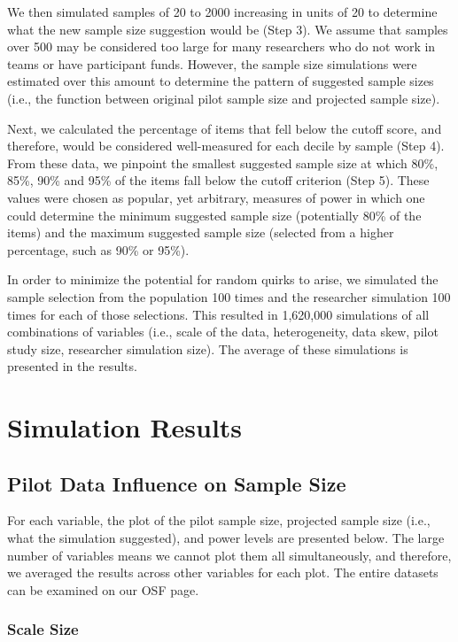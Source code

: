 \documentclass[
  man]{apa7}
\begin{document}
We then simulated samples of 20 to 2000 increasing in units of 20 to determine what the new sample size suggestion would be (Step 3). We assume that samples over 500 may be considered too large for many researchers who do not work in teams or have participant funds. However, the sample size simulations were estimated over this amount to determine the pattern of suggested sample sizes (i.e., the function between original pilot sample size and projected sample size).

Next, we calculated the percentage of items that fell below the cutoff score, and therefore, would be considered well-measured for each decile by sample (Step 4). From these data, we pinpoint the smallest suggested sample size at which 80\%, 85\%, 90\% and 95\% of the items fall below the cutoff criterion (Step 5). These values were chosen as popular, yet arbitrary, measures of power in which one could determine the minimum suggested sample size (potentially 80\% of the items) and the maximum suggested sample size (selected from a higher percentage, such as 90\% or 95\%).

In order to minimize the potential for random quirks to arise, we simulated the sample selection from the population 100 times and the researcher simulation 100 times for each of those selections. This resulted in 1,620,000 simulations of all combinations of variables (i.e., scale of the data, heterogeneity, data skew, pilot study size, researcher simulation size). The average of these simulations is presented in the results.

\section{Simulation Results}\label{simulation-results}

\subsection{Pilot Data Influence on Sample Size}\label{pilot-data-influence-on-sample-size}

For each variable, the plot of the pilot sample size, projected sample size (i.e., what the simulation suggested), and power levels are presented below. The large number of variables means we cannot plot them all simultaneously, and therefore, we averaged the results across other variables for each plot. The entire datasets can be examined on our OSF page.

\subsubsection{Scale Size}\label{scale-size}
\end{document}
